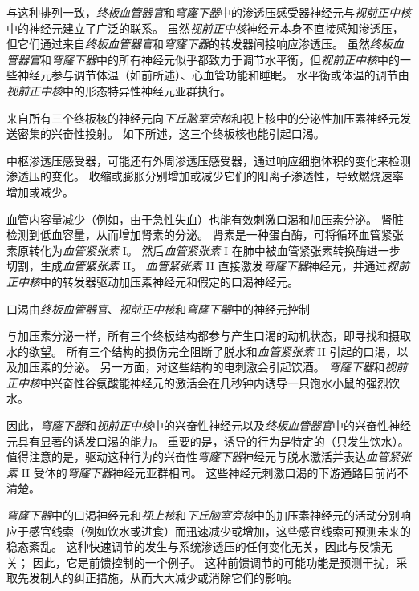 与这种排列一致，\textit{终板血管器官}和\textit{穹窿下器}中的渗透压感受器神经元与\textit{视前正中核}中的神经元建立了广泛的联系。
虽然\textit{视前正中核}神经元本身不直接感知渗透压，但它们通过来自\textit{终板血管器官}和\textit{穹窿下器}的转发器间接响应渗透压。
虽然\textit{终板血管器官}和\textit{穹窿下器}中的所有神经元似乎都致力于调节水平衡，但\textit{视前正中核}中的一些神经元参与调节体温（如前所述）、心血管功能和睡眠。
水平衡或体温的调节由\textit{视前正中核}中的形态特异性神经元亚群执行。


来自所有三个终板核的神经元向\textit{下丘脑室旁核}和视上核中的分泌性加压素神经元发送密集的兴奋性投射。
如下所述，这三个终板核也能引起口渴。


中枢渗透压感受器，可能还有外周渗透压感受器，通过响应细胞体积的变化来检测渗透压的变化。
收缩或膨胀分别增加或减少它们的阳离子渗透性，导致燃烧速率增加或减少。


血管内容量减少（例如，由于急性失血）也能有效刺激口渴和加压素分泌。
肾脏检测到低血容量，从而增加肾素的分泌。
肾素是一种蛋白酶，可将循环血管紧张素原转化为\textit{血管紧张素} I。
然后\textit{血管紧张素} I 在肺中被血管紧张素转换酶进一步切割，生成\textit{血管紧张素} II。
\textit{血管紧张素} II 直接激发\textit{穹窿下器}神经元，并通过\textit{视前正中核}中的转发器驱动加压素神经元和假定的口渴神经元。


口渴由\textit{终板血管器官}、\textit{视前正中核}和\textit{穹窿下器}中的神经元控制

与加压素分泌一样，所有三个终板结构都参与产生口渴的动机状态，即寻找和摄取水的欲望。
所有三个结构的损伤完全阻断了脱水和\textit{血管紧张素} II 引起的口渴，以及加压素的分泌。
另一方面，对这些结构的电刺激会引起饮酒。
\textit{穹窿下器}和\textit{视前正中核}中兴奋性谷氨酸能神经元的激活会在几秒钟内诱导一只饱水小鼠的强烈饮水。


因此，\textit{穹窿下器}和\textit{视前正中核}中的兴奋性神经元以及\textit{终板血管器官}中的兴奋性神经元具有显著的诱发口渴的能力。
重要的是，诱导的行为是特定的（只发生饮水）。
值得注意的是，驱动这种行为的兴奋性\textit{穹窿下器}神经元与脱水激活并表达\textit{血管紧张素} II 受体的\textit{穹窿下器}神经元亚群相同。
这些神经元刺激口渴的下游通路目前尚不清楚。


\textit{穹窿下器}中的口渴神经元和\textit{视上核}和\textit{下丘脑室旁核}中的加压素神经元的活动分别响应于感官线索（例如饮水或进食）而迅速减少或增加，这些感官线索可预测未来的稳态紊乱。
这种快速调节的发生与系统渗透压的任何变化无关，因此与反馈无关；
因此，它是前馈控制的一个例子。
这种前馈调节的可能功能是预测干扰，采取先发制人的纠正措施，从而大大减少或消除它们的影响。


